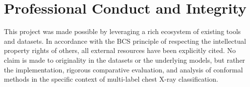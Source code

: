 \section{Professional Conduct and Integrity}

This project was made possible by leveraging a rich ecosystem of existing tools and datasets.
In accordance with the BCS principle of respecting the intellectual property rights of others,
all external resources have been explicitly cited.
No claim is made to originality in the datasets or the underlying models,
but rather the implementation, rigorous comparative evaluation,
and analysis of conformal methods in the specific context of multi-label chest X-ray classification.
